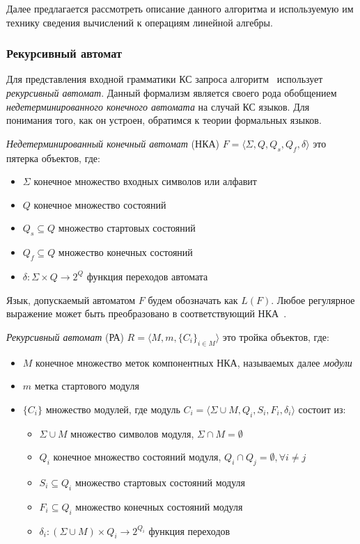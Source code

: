 Далее предлагается рассмотреть описание данного алгоритма и используемую им технику сведения вычислений к операциям линейной алгебры.

\subsubsection{Рекурсивный автомат}

Для представления входной грамматики КС запроса алгоритм~\cite{inbook:kronecker_cfpq_adbis} использует \textit{рекурсивный автомат}. Данный формализм является своего рода обобщением \textit{недетерминированного конечного автомата} на случай КС языков. Для понимания того, как он устроен, обратимся к теории формальных языков.

\textit{Недетерминированный конечный автомат} (НКА) $F = \langle \Sigma, Q, Q_s, Q_f, \delta \rangle$ это пятерка объектов, где:

\begin{itemize}
    \item $\Sigma$ конечное множество входных символов или алфавит
    \item $Q$ конечное множество состояний
    \item $Q_s \subseteq Q$ множество стартовых состояний
    \item $Q_f \subseteq Q$ множество конечных состояний
    \item $\delta : \Sigma \times Q \rightarrow 2^Q$ функция переходов автомата
\end{itemize}

Язык, допускаемый автоматом $F$ будем обозначать как $L(F)$. Любое регулярное выражение может быть преобразовано в соответствующий НКА~\cite{book:automata_theory}. 

\textit{Рекурсивный автомат} (РА) $R = \langle M, m, \{C_i\}_{i \in M} \rangle$ это тройка объектов, где: 

\begin{itemize}
    \item $M$ конечное множество меток компонентных НКА, называемых далее \textit{модули}
    \item $m$ метка стартового модуля
    \item $\{C_i\}$ множество модулей, где модуль $C_i = \langle \Sigma \cup M, Q_i, S_i, F_i, \delta _i \rangle$ состоит из:
    {
    \begin{itemize}
        \item $\Sigma \cup M$ множество символов модуля, $\Sigma \cap M = \emptyset$
        \item $Q_i$ конечное множество состояний модуля, $Q_i \cap Q_j = \emptyset, \forall i \neq j$
        \item $S_i \subseteq Q_i$ множество стартовых состояний модуля
        \item $F_i \subseteq Q_i$ множество конечных состояний модуля 
        \item $\delta_i : (\Sigma \cup M) \times Q_i \rightarrow 2^{Q_i}$ функция переходов
    \end{itemize}
    }
\end{itemize}

